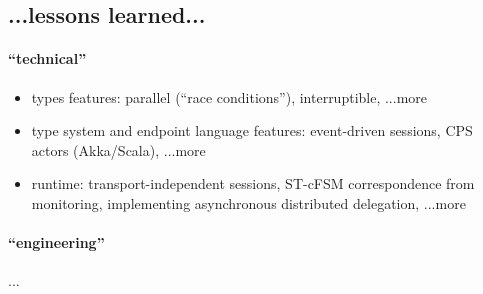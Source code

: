 %
%
%
%
%


\subsection{...lessons learned...}

\paragraph{``technical''}

\begin{itemize}
\item
types features: parallel (``race conditions''), interruptible, ...more

\item
type system and endpoint language features: event-driven sessions, CPS actors (Akka/Scala), ...more

\item
runtime: transport-independent sessions, ST-cFSM correspondence from monitoring, implementing asynchronous distributed delegation, ...more
\end{itemize}


\paragraph{``engineering''}

...

